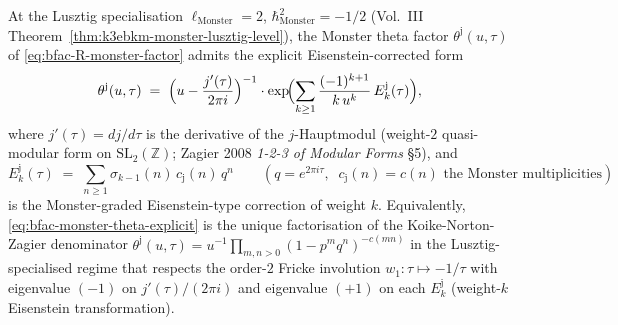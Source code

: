 \begin{theorem}[Monster theta specialisation at \texorpdfstring{$\ell_{\mathrm{Monster}} = 2$}{l-Monster = 2}]
\label{thm:bfac-monster-theta-specialisation}
At the Lusztig specialisation $\ell_{\mathrm{Monster}} = 2$,
$\hbar^2_{\mathrm{Monster}} = -1/2$
(Vol.~III Theorem~\ref{thm:k3ebkm-monster-lusztig-level}), the Monster
theta factor $\theta^{\mathrm j}(u,\tau)$ of
\eqref{eq:bfac-R-monster-factor} admits the explicit Eisenstein-corrected
form
\begin{equation}
\label{eq:bfac-monster-theta-explicit}
 \theta^{\mathrm j}(u,\tau)
 \;=\;
 \Bigl(u - \frac{j'(\tau)}{2\pi i}\Bigr)^{-1}
 \cdot
 \exp\!\Bigl(\sum_{k\geq 1} \frac{(-1)^{k+1}}{k\,u^k}\,
 E_{k}^{\mathrm{j}}(\tau)\Bigr),
\end{equation}
where $j'(\tau) = dj/d\tau$ is the derivative of the $j$-Hauptmodul
(weight-$2$ quasi-modular form on $\mathrm{SL}_2(\mathbb Z)$;
Zagier 2008 \emph{1-2-3 of Modular Forms} \S5), and
\[
 E_k^{\mathrm j}(\tau)
 \;=\;
 \sum_{n\geq 1} \sigma_{k-1}(n)\,c_{\mathrm j}(n)\,q^n
 \qquad
 (q = e^{2\pi i\tau},\;\;c_{\mathrm j}(n) = c(n)\text{ the Monster multiplicities})
\]
is the Monster-graded Eisenstein-type correction of weight $k$.
Equivalently, \eqref{eq:bfac-monster-theta-explicit} is the unique
factorisation of the Koike-Norton-Zagier denominator
$\theta^{\mathrm j}(u,\tau) = u^{-1}\prod_{m,n>0}(1-p^mq^n)^{-c(mn)}$
in the Lusztig-specialised regime that respects the
order-$2$ Fricke involution $w_1\colon\tau\mapsto -1/\tau$ with
eigenvalue $(-1)$ on $j'(\tau)/(2\pi i)$ and eigenvalue $(+1)$ on
each $E_k^{\mathrm j}$ (weight-$k$ Eisenstein transformation).
\end{theorem}

